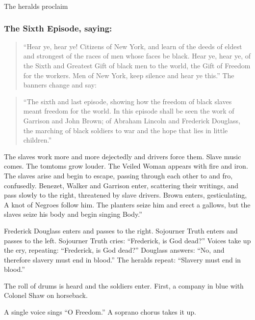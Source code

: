 \documentclass[letterpaper,10pt,english]{jupyterBook}
\begin{document}
\sphinxAtStartPar
The heralds proclaim


\subsubsection{The Sixth Episode, saying:}
\label{\detokenize{Volumes/06/07/national_emancipation_exposition:the-sixth-episode-saying}}\begin{quote}

\sphinxAtStartPar
“Hear ye, hear ye! Citizens of New York, and learn of the deeds of eldest and strongest of the races of men whose faces be black. Hear ye, hear ye, of the Sixth and Greatest Gift of black men to the world, the Gift of Freedom for the workers. Men of New York, keep silence and hear ye this.” The banners change and say:
\end{quote}
\begin{quote}

\sphinxAtStartPar
“The sixth and last episode, showing how the freedom of black slaves meant freedom for the world. In this episode shall be seen the work of Garrison and John Brown; of Abraham Lincoln and Frederick Douglass,  the marching of black soldiers to war and the hope that lies in little children.”
\end{quote}

\sphinxAtStartPar
The slaves work more and more dejectedly and drivers force them. Slave music comes. The tomtoms grow louder. The Veiled Woman appears with fire and iron. The slaves arise and begin to escape, passing through each other to and fro, confusedly. Benezet, Walker and Garrison enter, scattering their writings, and pass slowly to the right, threatened by slave drivers. Brown enters, gesticulating, A knot of Negroes follow him. The planters seize him and erect a gallows, but the slaves seize his body and begin singing Body.”

\sphinxAtStartPar
Frederick Douglass enters and passes to the right. Sojourner Truth enters and passes to the left. Sojourner Truth cries: “Frederick, is God dead?” Voices take up the ery, repeating: “Frederick, is God dead?” Douglass answers: “No, and therefore slavery must end in blood.” The heralds repeat: “Slavery must end in blood.”

\sphinxAtStartPar
The roll of drums is heard and the soldiers enter. First, a company in blue with Colonel Shaw on horseback.

\sphinxAtStartPar
A single voice sings “O Freedom.” A soprano chorus takes it up.
\end{document}
